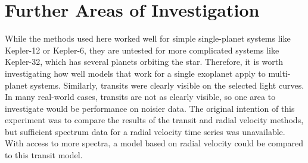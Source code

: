 \section{Further Areas of Investigation}

While the methods used here worked well for simple single-planet systems like Kepler-12 or Kepler-6, they are untested for more complicated systems
like Kepler-32, which has several planets orbiting the star. Therefore, it is worth investigating how well models that work for a single exoplanet
apply to multi-planet systems. Similarly, transits were clearly visible on the selected light curves. In many real-world cases, transits are not as
clearly visible, so one area to investigate would be performance on noisier data. The original intention of this experiment was to compare the results
of the transit and radial velocity methods, but sufficient spectrum data for a radial velocity time series was unavailable. With access to more spectra,
a model based on radial velocity could be compared to this transit model.
